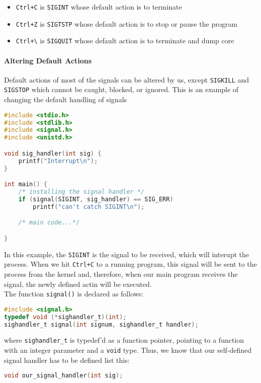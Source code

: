 \documentclass{article}
\renewcommand{\b}{\item[$\circ$]}
\newcommand{\newlist}{\begin{itemize}}
\renewcommand{\endlist}{\end{itemize}}
\newcommand{\code}[1]{\texttt{#1}}
\begin{document}
\newlist 
\b \code{Ctrl+C} is \code{SIGINT} whose default action is to terminate
\b \code{Ctrl+Z} is \code{SIGTSTP} whose default action is to stop or pause the program
\b \code{Ctrl+\textbackslash} is \code{SIGQUIT} whose default action is to terminate and dump core
\endlist 

\paragraph{Altering Default Actions}

Default actions of most of the signals can be altered by us, except \code{SIGKILL} and \code{SIGSTOP} which cannot be caught, blocked, or ignored. This is an example of changing the default handling of signals

\begin{lstlisting}[language=c]
#include <stdio.h>
#include <stdlib.h>
#include <signal.h>
#include <unistd.h>

void sig_handler(int sig) {
    printf("Interrupt\n");
}

int main() {
    /* installing the signal handler */
    if (signal(SIGINT, sig_handler) == SIG_ERR)
        printf("can't catch SIGINT\n");

    /* main code...*/

}
\end{lstlisting}

In this example, the \code{SIGINT} is the signal to be received, which will interupt the process. When we hit \code{Ctrl+C} to a running program, this signal will be sent to the process from the kernel and, therefore, when our main program receives the signal, the newly defined actin will be executed. \\ 

The function \code{signal()} is declared as follows:

\begin{lstlisting}[language=C]
#include <signal.h>
typedef void (*sighandler_t)(int);
sighandler_t signal(int signum, sighandler_t handler);
\end{lstlisting}

where \code{sighandler\_t} is typedef'd as a function pointer, pointing to a function with an integer parameter and a \code{void} type. Thus, we know that our self-defined signal handler has to be defined list this:

\begin{lstlisting}[language=C]
void our_signal_handler(int sig);
\end{lstlisting}
\end{document}
